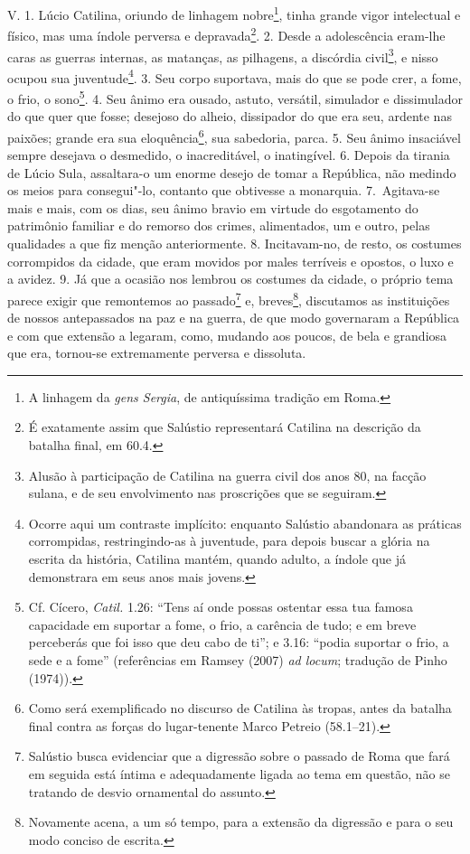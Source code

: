 V. 1. Lúcio Catilina, oriundo de linhagem nobre\footnote{A linhagem da
\emph{gens Sergia}, de antiquíssima tradição em Roma.}, tinha grande vigor
intelectual e físico, mas uma índole perversa e depravada\footnote{É exatamente
assim que Salústio representará Catilina na descrição da batalha final, em 60.4.}. 2. Desde a adolescência eram-lhe caras as guerras internas, as matanças,
as pilhagens, a discórdia civil\footnote{Alusão à participação de Catilina na
guerra civil dos anos 80, na facção sulana, e de seu envolvimento nas
proscrições que se seguiram.}, e nisso ocupou sua juventude\footnote{Ocorre
aqui um contraste implícito: enquanto Salústio abandonara as práticas
corrompidas, restringindo-as à juventude, para depois buscar a glória na
escrita da história, Catilina mantém, quando adulto, a índole que já
demonstrara em seus anos mais jovens.}. 3. Seu corpo suportava, mais do que se
pode crer, a fome, o frio, o sono\footnote{Cf. Cícero, \emph{Catil.} 1.26:  ``Tens aí onde possas ostentar essa tua famosa capacidade em suportar a
fome, o frio, a carência de tudo; e em breve perceberás que foi isso que deu
cabo de ti''; e 3.16: ``podia suportar o frio, a sede e a fome'' (referências
em Ramsey (2007) \emph{ad locum}; tradução de Pinho (1974)).}. 4. Seu ânimo era
ousado, astuto, versátil, simulador e dissimulador do que quer que fosse;
desejoso do alheio, dissipador do que era seu, ardente nas paixões; grande era
sua eloquência\footnote{Como será exemplificado no
discurso de Catilina às tropas, antes da batalha final contra as forças do
lugar-tenente Marco Petreio (58.1--21).}, sua sabedoria, parca. 5. Seu ânimo insaciável sempre
desejava o desmedido, o inacreditável, o inatingível. 6. Depois da tirania de
Lúcio Sula, assaltara-o um enorme desejo de tomar a República, não medindo os
meios para consegui"-lo, contanto que obtivesse a monarquia. 7.~Agitava-se mais
e mais, com os dias, seu ânimo bravio em virtude do esgotamento do patrimônio
familiar e do remorso dos crimes, alimentados, um e outro, pelas qualidades a
que fiz menção anteriormente. 8. Incitavam-no, de resto, os costumes
corrompidos da cidade, que eram movidos por males terríveis e opostos, o luxo e
a avidez. 9. Já que a ocasião nos lembrou os costumes da cidade, o próprio tema
parece exigir que remontemos ao passado\footnote{Salústio busca evidenciar que
a digressão sobre o passado de Roma que fará em seguida está íntima e
adequadamente ligada ao tema em questão, não se tratando de desvio ornamental
do assunto.} e, breves\footnote{Novamente acena, a um só tempo, para a extensão
da digressão e para o seu modo conciso de escrita.}, discutamos as instituições
de nossos antepassados na paz e na guerra, de que modo governaram a República e
com que extensão a legaram, como, mudando aos poucos, de bela e grandiosa que
era, tornou-se extremamente perversa e dissoluta.

